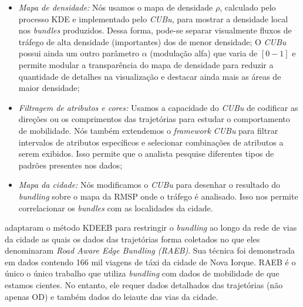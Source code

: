 \begin{itemize}
\item\emph{Mapa de densidade:} Nós usamos o mapa de densidade $\rho$,
calculado pelo processo KDE e implementado pelo \emph{CUBu}, para mostrar a densidade
local nos \emph{bundles} produzidos. Dessa forma, pode-se separar visualmente
fluxos de tráfego de alta densidade (importantes) dos de menor densidade; O \emph{CUBu}
possui ainda um outro parâmetro $\alpha$ (modulação alfa) que varia de $[0 - 1]$
e permite modular a transparência do mapa de densidade para reduzir a quantidade de detalhes
na visualização e destacar ainda mais as áreas de maior densidade;
 
\item\emph{Filtragem de atributos e cores:} Usamos a capacidade do \emph{CUBu} de
codificar as direções ou os comprimentos das trajetórias para
estudar o comportamento de mobilidade. Nós também extendemos o \emph{framework} \emph{CUBu}
para filtrar intervalos de atributos específicos e selecionar combinações de atributos a
serem exibidos. Isso permite que o analista pesquise diferentes tipos de padrões
presentes nos dados;

\item\emph{Mapa da cidade:} Nós modificamos o \emph{CUBu} para desenhar
o resultado do \emph{bundling} sobre o mapa da RMSP onde o tráfego é analisado. Isso nos permite
correlacionar os \emph{bundles} com as localidades da cidade.
\end{itemize}


\citet{zeng:19} adaptaram o método KDEEB para restringir o \emph{bundling}
ao longo da rede de vias da cidade as quais os dados das trajetórias forma
coletados no que eles denominaram \emph{Road Aware Edge
Bundling (RAEB)}. Sua técnica foi demonstrada em dados contendo
166 mil viagens de táxi da cidade de Nova Iorque. RAEB é o único o único
trabalho que utiliza \emph{bundling} com dados de mobilidade de que estamos cientes.
No entanto, ele requer dados detalhados das trajetórias (não apenas OD) e também
dados do leiaute das vias da cidade.

